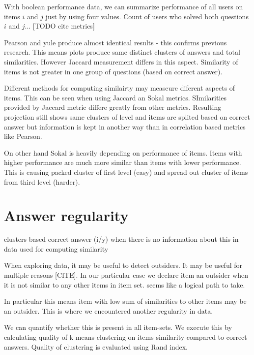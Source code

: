 \documentclass[
  digital, %
  table,   %
  nolof,     %
  nolot,     %
  nocover
]{fithesis3}
\begin{document}

With boolean performance data, we can summarize performance of all users on items $i$ and $j$ just by using four values. Count of users who solved both questions $i$ and $j$... [TODO cite metrics]

Pearson and yule produce almost identical results - this confirms
previous research. This means plots produce same distinct clusters of
answers and total similarities. However Jaccard measurement differs in
this aspect. Similarity of items is not greater in one group of
questions (based on correct answer).

Different methods for computing similairty may measeure diferent aspects
of items. This can be seen when using Jaccard an Sokal metrics.
SImilarities provided by Jaccard metric differe greatly from other
metrics. Resulting projection still shows same clusters of level and
items are splited based on correct answer but information is kept in
another way than in correlation based metrics like Pearson.

On other hand Sokal is heavily depending on performance of items. Items
with higher performance are much more similar than items with lower
performance. This is causing packed cluster of first level (easy) and
spread out cluster of items from third level (harder).

\section{Answer regularity}\label{answer-regularity}

clusters based correct answer (i/y) when there is no information about
this in data used for computing similarity


When exploring data, it may be useful to detect outsiders. It may be
useful for multiple reasons [CITE]. In our particular case we
declare item an outsider when it is not similar to any other items in
item set. seems like a logical path to take.

In particular this means item with low sum of similarities to other
items may be an outsider. This is where we encountered another
regularity in data.


We can quantify whether this is present in all item-sets. We execute this by calculating quality of k-means clustering on items similarity compared to correct answers. Quality of clustering is evaluated using Rand index.
\end{document}
